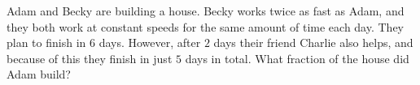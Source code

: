 Adam and Becky are building a house. Becky works twice as fast as Adam, and they both work at constant speeds for the same amount of time each day. They plan to finish in $6$ days. However, after $2$ days their friend Charlie also helps, and because of this they finish in just $5$ days in total. What fraction of the house did Adam build?
